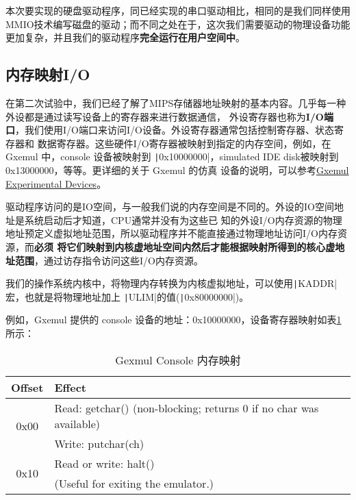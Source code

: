 本次要实现的硬盘驱动程序，同已经实现的串口驱动相比，相同的是我们同样使用MMIO技术编写磁盘的驱动；而不同之处在于，这次我们需要驱动的物理设备功能更加复杂，并且我们的驱动程序\textbf{完全运行在用户空间中}。

\subsection{内存映射I/O}

在第二次试验中，我们已经了解了MIPS存储器地址映射的基本内容。几乎每一种外设都是通过读写设备上的寄存器来进行数据通信，
外设寄存器也称为\textbf{I/O端口}，我们使用I/O端口来访问I/O设备。外设寄存器通常包括控制寄存器、状态寄存器和
数据寄存器。这些硬件I/O寄存器被映射到指定的内存空间，例如，在 Gxemul 中，console 设备被映射到
\texttt|0x10000000|，simulated IDE disk被映射到 0x13000000，等等。更详细的关于 Gxemul 的仿真
设备的说明，可以参考\href{http://gxemul.sourceforge.net/gxemul-stable/doc/experiments.html}{Gxemul
Experimental Devices}。

驱动程序访问的是IO空间，与一般我们说的内存空间是不同的。外设的IO空间地址是系统启动后才知道，CPU通常并没有为这些已
知的外设I/O内存资源的物理地址预定义虚拟地址范围，所以驱动程序并不能直接通过物理地址访问I/O内存资源，而\textbf{必须
将它们映射到内核虚地址空间内然后才能根据映射所得到的核心虚地址范围}，通过访存指令访问这些I/O内存资源。

我们的操作系统内核中，将物理内存转换为内核虚拟地址，可以使用\texttt|KADDR|宏，也就是将物理地址加上
\texttt|ULIM|的值(\texttt|0x80000000|)。

例如，Gxemul 提供的 console 设备的地址：0x10000000，设备寄存器映射如表\ref{lab5-table-console-mem-map}所示：

\begin{table}[htbp]
\caption{Gexmul Console 内存映射}\label{lab5-table-console-mem-map}
\centering
\begin{tabular}{|c|l|}
  \hline
    Offset & Effect \\
  \hline
  \multirow{2}{*}{0x00} & Read: getchar() (non-blocking; returns 0 if no char was available) \\
  \cline{2-2}
    & Write: putchar(ch) \\
  \hline
    \multirow{2}{*}{0x10} & Read or write: halt() \\
  \cline{2-2}
    & (Useful for exiting the emulator.) \\
  \hline
\end{tabular}
\end{table}

